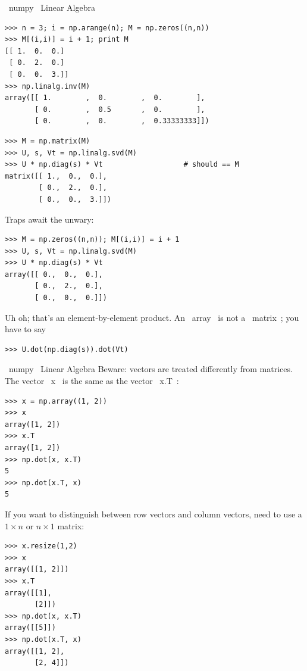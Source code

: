\documentclass[10pt, t]{beamer}
\let\verb=\codeDelimTwiddles
\begin{document}
\begin{frame}[fragile,label=sec-3-33]{\verb~numpy~ Linear Algebra}
 \pause
\lstset{language=Python,label= ,caption= ,numbers=none}
\begin{lstlisting}
>>> n = 3; i = np.arange(n); M = np.zeros((n,n))
>>> M[(i,i)] = i + 1; print M
[[ 1.  0.  0.]
 [ 0.  2.  0.]
 [ 0.  0.  3.]]
>>> np.linalg.inv(M)
array([[ 1.        ,  0.        ,  0.        ],
       [ 0.        ,  0.5       ,  0.        ],
       [ 0.        ,  0.        ,  0.33333333]])
\end{lstlisting}

\pause
\lstset{language=Python,label= ,caption= ,numbers=none}
\begin{lstlisting}
>>> M = np.matrix(M)
>>> U, s, Vt = np.linalg.svd(M)
>>> U * np.diag(s) * Vt                   # should == M
matrix([[ 1.,  0.,  0.],
        [ 0.,  2.,  0.],
        [ 0.,  0.,  3.]])
\end{lstlisting}

\pause
Traps await the unwary:
\lstset{language=Python,label= ,caption= ,numbers=none}
\begin{lstlisting}
>>> M = np.zeros((n,n)); M[(i,i)] = i + 1
>>> U, s, Vt = np.linalg.svd(M)
>>> U * np.diag(s) * Vt
array([[ 0.,  0.,  0.],
       [ 0.,  2.,  0.],
       [ 0.,  0.,  0.]])
\end{lstlisting}
Uh oh; that's an element-by-element product.
\pause
An \verb~array~ is not a \verb~matrix~; you have to say
\lstset{language=Python,label= ,caption= ,numbers=none}
\begin{lstlisting}
>>> U.dot(np.diag(s)).dot(Vt)
\end{lstlisting}
\end{frame}


\begin{frame}[fragile,label=sec-3-34]{\verb~numpy~ Linear Algebra}
 Beware: vectors are treated differently from matrices.  The vector \verb~x~ is the
same as the vector \verb~x.T~:
\lstset{language=Python,label= ,caption= ,numbers=none}
\begin{lstlisting}
>>> x = np.array((1, 2))
>>> x
array([1, 2])
>>> x.T
array([1, 2])
>>> np.dot(x, x.T)
5
>>> np.dot(x.T, x)
5
\end{lstlisting}
\pause
If you want to distinguish between row vectors and column vectors, need to use a
$1\times n$ or $n\times 1$ matrix:
\lstset{language=Python,label= ,caption= ,numbers=none}
\begin{lstlisting}
>>> x.resize(1,2)
>>> x
array([[1, 2]])
>>> x.T
array([[1],
       [2]])
>>> np.dot(x, x.T)
array([[5]])
>>> np.dot(x.T, x)
array([[1, 2],
       [2, 4]])
\end{lstlisting}
\end{frame}
\end{document}
